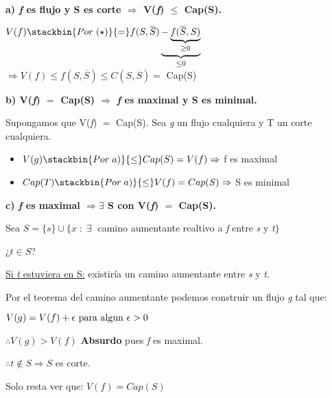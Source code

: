 \documentclass[12pt,a4paper]{report}
\begin{document}
		\textbf{a) \textit{f} es flujo y S es corte $\Rightarrow$ V(\textit{f}) $\leq$ Cap(S).}
		
			\begin{center}
				$V(f) \stackbin{Por \; (\star)}{=} f(S, \overline{S})\underbrace{-\underbrace{f(\overline{S}, S)}_{\geq 0}}_{\leq 0}$ \\
				
				\vspace{5mm}
				$\Rightarrow V(f ) \leq f(S, \overline{S}) \leq C(S, \overline{S}) =$ Cap(S)
			\end{center}
			
		\textbf{b) V(\textit{f}) $=$ Cap(S) $\Rightarrow$ \textit{f} es maximal y S es minimal.}
			
			\vspace{2mm}
			Supongamos que V(\textit{f}) $=$ Cap(S). Sea \textit{g} un flujo cualquiera y T un corte cualquiera.
			\begin{itemize}
				\item $V(g) \stackbin{Por \; a)}{\leq} Cap(S) = V(f) \Rightarrow$ f es maximal 
				\item $Cap(T) \stackbin{Por \; a)}{\leq} V(f) = Cap(S) \Rightarrow$ S es minimal
			\end{itemize}
		
		\vspace{5mm}
		\textbf{c) \textit{f} es maximal $\Rightarrow \exists$ S con V(\textit{f}) $=$ Cap(S).}
			
			\vspace{2mm}
			Sea $S = \{s\} \cup \{x \; : \; \exists \;$ camino aumentante realtivo a \textit{f} entre \textit{s} y \textit{t}$\}$
			
			\vspace{5mm}
			¿$t \in S$?

			\underline{Si \textit{t} estuviera en S:} existiría un camino aumentante entre \textit{s} y \textit{t}.
				
				Por el teorema del camino aumentante podemos construir un  flujo \textit{g} tal que:
				\begin{center}
					$V(g) = V(f) + \epsilon \textup{ para algun } \epsilon > 0$
					
					$\therefore V(g) > V(f)$ \textbf{Absurdo} pues \textit{f} es maximal.
				\end{center}
				
				$\therefore t \notin S \Rightarrow S$ es corte.
				
				\begin{center}
					Solo resta ver que: $V(f) = Cap(S)$
				\end{center}
				
\end{document}
